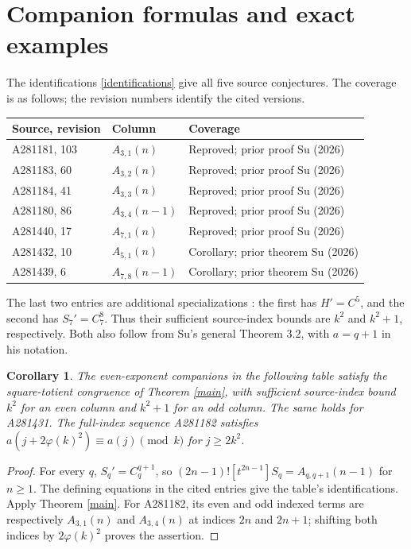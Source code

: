 \documentclass[11pt]{article}
\newtheorem{corollary}{Corollary}
\begin{document}
\section{Companion formulas and exact examples}
The identifications \eqref{identifications} give all five source
conjectures. The coverage is as follows; the revision numbers identify
the cited versions.
\begin{center}\small
\begin{tabular}{lll}
\toprule
Source, revision & Column & Coverage\\
\midrule
A281181, 103 & $A_{3,1}(n)$ & Reproved; prior proof Su (2026)\\
A281183, 60 & $A_{3,2}(n)$ & Reproved; prior proof Su (2026)\\
A281184, 41 & $A_{3,3}(n)$ & Reproved; prior proof Su (2026)\\
A281180, 86 & $A_{3,4}(n-1)$ & Reproved; prior proof Su (2026)\\
A281440, 17 & $A_{7,1}(n)$ & Reproved; prior proof Su (2026)\\
A281432, 10 & $A_{5,1}(n)$ & Corollary; prior theorem Su (2026)\\
A281439, 6 & $A_{7,8}(n-1)$ & Corollary; prior theorem Su (2026)\\
\bottomrule
\end{tabular}
\end{center}
The last two entries are additional specializations
\cite{oeis432,oeis439}: the first has $H'=C^5$, and the second has
$S_7'=C_7^8$. Thus their sufficient source-index bounds are $k^2$
and $k^2+1$, respectively. Both also follow from Su's general
Theorem 3.2, with $a=q+1$ in his notation.
\begin{corollary}\label{companions}
The even-exponent companions in the following table satisfy the
square-totient congruence of Theorem \ref{main}, with sufficient
source-index bound $k^2$ for an even column and $k^2+1$ for an odd column.
The same holds for A281431. The full-index sequence A281182 satisfies
$a(j+2\varphi(k)^2)\equiv a(j)\pmod{k}$ for $j\geq2k^2$.
\end{corollary}
\begin{proof}
For every $q$, $S_q'=C_q^{q+1}$, so
$(2n-1)![t^{2n-1}]S_q=A_{q,q+1}(n-1)$ for $n\geq1$.
The defining equations in the cited entries give the table's
identifications. Apply Theorem \ref{main}.
For A281182, its even and odd indexed terms are respectively
$A_{3,1}(n)$ and $A_{3,4}(n)$ at indices $2n$ and $2n+1$;
shifting both indices by $2\varphi(k)^2$ proves the assertion.
\end{proof}
\end{document}
